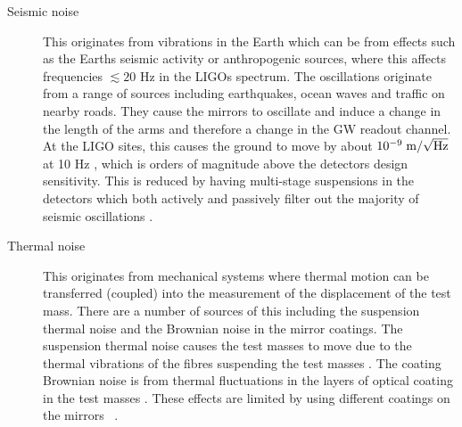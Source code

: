 \begin{description}
\item[Seismic noise] This originates from vibrations in the Earth which can be from effects such as the Earths seismic
activity or anthropogenic sources, where this affects frequencies $\lesssim 20$ Hz in the \glspl{LIGO} spectrum. The oscillations originate
from a range of sources including earthquakes, ocean waves and traffic on nearby roads. They cause the mirrors to
oscillate and induce a change
in the length of the arms and therefore a change in the \gls{GW} readout channel. 
At the \gls{LIGO} sites, this causes the ground to move by about $10^{-9}\; \rm{m}/\sqrt{\rm{Hz}}$ at 10 Hz \citep{martynov2016SensitivityAdvanced}, which is orders of magnitude above the detectors design sensitivity. 
This is reduced by having multi-stage suspensions in the detectors which both actively and passively filter out the majority of seismic oscillations
\citep{matichard2015SeismicIsolation}.


\item[Thermal noise] This originates from mechanical systems where thermal
motion can be transferred (coupled) into the measurement of the displacement of
the test mass. There are a number of sources of this including the suspension
thermal noise and the Brownian noise in the mirror coatings.  The suspension
thermal noise causes the test masses to move due to the thermal vibrations of
the fibres suspending the test masses
\citep{gonzalez2007HandbookApproximation}.  The coating Brownian noise is from
thermal fluctuations in the layers of optical coating in the test masses
\citep{martynov2016SensitivityAdvanced}. These effects are limited by using
different coatings on the mirrors
\citep{abernathy0OverviewResearch}~.


\end{description}
